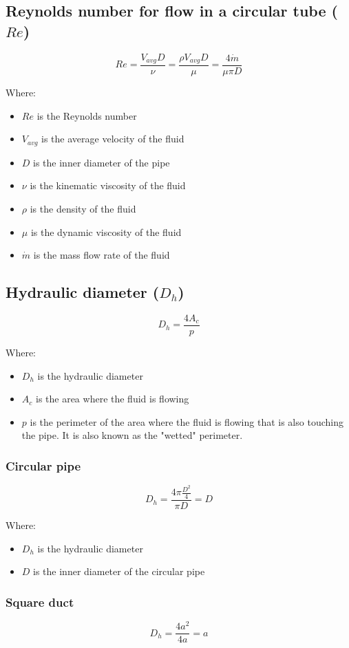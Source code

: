 \documentclass[11pt]{article}
\begin{document}
\subsection{Reynolds number for flow in a circular tube (\(Re\))}
\label{sec:orgee7a4b0}
\[Re = \frac{V_{avg} D}{\nu} = \frac{\rho V_{avg} D}{\mu} = \frac{4 \dot{m}}{\mu \pi D}\]

Where:
\begin{itemize}
\item \(Re\) is the Reynolds number
\item \(V_{avg}\) is the average velocity of the fluid
\item \(D\) is the inner diameter of the pipe
\item \(\nu\) is the kinematic viscosity of the fluid
\item \(\rho\) is the density of the fluid
\item \(\mu\) is the dynamic viscosity of the fluid
\item \(\dot{m}\) is the mass flow rate of the fluid
\end{itemize}
\subsection{Hydraulic diameter (\(D_h\))}
\label{sec:org85d1479}
\[D_h = \frac{4 A_c}{p}\]

Where:
\begin{itemize}
\item \(D_h\) is the hydraulic diameter
\item \(A_c\) is the area where the fluid is flowing
\item \(p\) is the perimeter of the area where the fluid is flowing that is also touching the pipe. It is also known as the "wetted" perimeter.
\end{itemize}
\subsubsection{Circular pipe}
\label{sec:orgac07da3}
\[D_h = \frac{4 \pi \frac{D^2}{4}}{\pi D} = D\]

Where:
\begin{itemize}
\item \(D_h\) is the hydraulic diameter
\item \(D\) is the inner diameter of the circular pipe
\end{itemize}
\subsubsection{Square duct}
\label{sec:org6b2809e}
\[D_h = \frac{4a^2}{4a} = a\]
\end{document}
